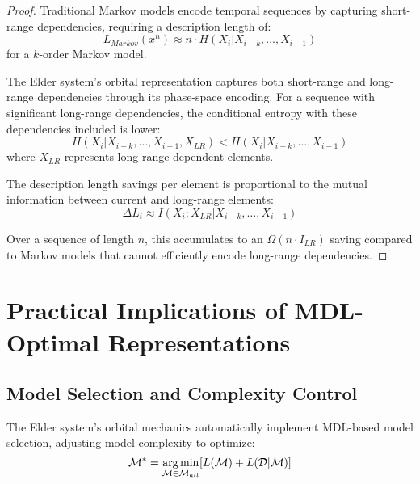 \begin{proof}
Traditional Markov models encode temporal sequences by capturing short-range dependencies, requiring a description length of:
\begin{equation}
L_{Markov}(x^n) \approx n \cdot H(X_i | X_{i-k}, \ldots, X_{i-1})
\end{equation}
for a $k$-order Markov model.

The Elder system's orbital representation captures both short-range and long-range dependencies through its phase-space encoding. For a sequence with significant long-range dependencies, the conditional entropy with these dependencies included is lower:
\begin{equation}
H(X_i | X_{i-k}, \ldots, X_{i-1}, X_{LR}) < H(X_i | X_{i-k}, \ldots, X_{i-1})
\end{equation}
where $X_{LR}$ represents long-range dependent elements.

The description length savings per element is proportional to the mutual information between current and long-range elements:
\begin{equation}
\Delta L_i \approx I(X_i; X_{LR} | X_{i-k}, \ldots, X_{i-1})
\end{equation}

Over a sequence of length $n$, this accumulates to an $\Omega(n \cdot I_{LR})$ saving compared to Markov models that cannot efficiently encode long-range dependencies.
\end{proof}

\section{Practical Implications of MDL-Optimal Representations}

\subsection{Model Selection and Complexity Control}

\begin{theorem}
The Elder system's orbital mechanics automatically implement MDL-based model selection, adjusting model complexity to optimize:
\begin{equation}
\mathcal{M}^* = \mathop{\mathrm{arg\,min}}_{\mathcal{M} \in \mathcal{M}_{all}} [L(\mathcal{M}) + L(\mathcal{D} | \mathcal{M})]
\end{equation}
\end{theorem}

